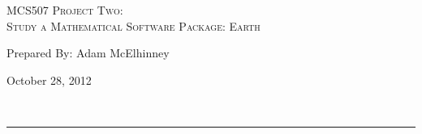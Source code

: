 \begin{center}
\textsc{\Large MCS507 Project Two:\\}
\textsc{Study a Mathematical Software Package: Earth}
\end{center}
\begin{minipage}{0.6\textwidth}
\begin{flushleft}
	Prepared By: Adam McElhinney
\end{flushleft}
\end{minipage}
\begin{minipage}{0.39\textwidth}
\begin{flushright}
	October 28, 2012
\end{flushright}
\end{minipage}\\[0.01in]
\hrule